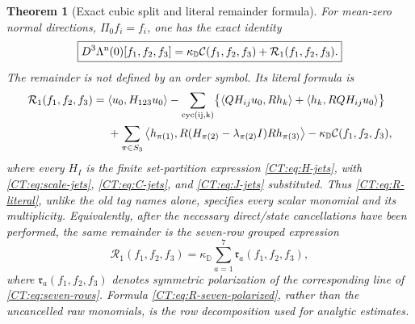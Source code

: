 \documentclass[11pt]{amsart}
\numberwithin{equation}{section}
\newtheorem{theorem}{Theorem}[section]
\theoremstyle{definition}
\theoremstyle{remark}
\newcommand{\PiZero}{\Pi_0}
\newcommand{\Cnull}{\mathcal C}
\newcommand{\Rone}{\mathcal R_1}
\begin{document}
\begin{theorem}[Exact cubic split and literal remainder formula]
\label{CT:thm:complete-split}
For mean-zero normal directions, $\PiZero f_i=f_i$, one has the exact
identity
\begin{equation}\label{CT:eq:complete-split}
 \boxed{
 D^3\Lambda^{\rm n}(0)[f_1,f_2,f_3]
 =\kappa_{\mathbb D}\Cnull(f_1,f_2,f_3)
  +\Rone(f_1,f_2,f_3).}
\end{equation}
The remainder is not defined by an order symbol.  Its literal formula is
\begin{align}
 \Rone(f_1,f_2,f_3)={}&
 \langle u_0,H_{123}u_0\rangle
 -\sum_{\rm cyc(ij,k)}
 \bigl\{\langle QH_{ij}u_0,Rh_k\rangle
        +\langle h_k,RQH_{ij}u_0\rangle\bigr\}
 \notag\\
 &+\sum_{\pi\in S_3}
 \left\langle h_{\pi(1)},
 R(H_{\pi(2)}-\lambda_{\pi(2)}I)R
 h_{\pi(3)}\right\rangle
 -\kappa_{\mathbb D}\Cnull(f_1,f_2,f_3),
 \label{CT:eq:R-literal}
\end{align}
where every $H_I$ is the finite set-partition expression
\eqref{CT:eq:H-jets}, with \eqref{CT:eq:scale-jets}, \eqref{CT:eq:C-jets}, and
\eqref{CT:eq:J-jets} substituted.  Thus \eqref{CT:eq:R-literal}, unlike the old
tag names alone, specifies every scalar monomial and its multiplicity.
Equivalently, after the necessary direct/state cancellations have been
performed, the same remainder is the seven-row grouped expression
\begin{equation}\label{CT:eq:R-seven-polarized}
 \boxed{\Rone(f_1,f_2,f_3)
 =\kappa_{\mathbb D}\sum_{a=1}^7
   \mathfrak r_a(f_1,f_2,f_3),}
\end{equation}
where $\mathfrak r_a(f_1,f_2,f_3)$ denotes symmetric polarization of the
corresponding line of \eqref{CT:eq:seven-rows}.  Formula
\eqref{CT:eq:R-seven-polarized}, rather than the uncancelled raw monomials, is
the row decomposition used for analytic estimates.


\end{theorem}
\end{document}
